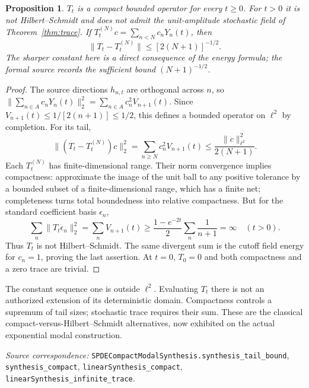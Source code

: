 \documentclass[11pt]{article}
\newtheorem{proposition}[theorem]{Proposition}
\newcommand{\code}[1]{{\small\nolinkurl{#1}}}
\begin{document}
\begin{proposition}\label{prop:compact}
$T_t$ is a compact bounded operator for every $t\geq0$. For $t>0$ it
is not Hilbert--Schmidt and does not admit the unit-amplitude stochastic
field of Theorem~\ref{thm:trace}. If
$T_t^{(N)}c=\sum_{n<N}c_nY_n(t)$, then
\[
 \|T_t-T_t^{(N)}\|\leq[2(N+1)]^{-1/2}.
\]
The sharper constant here is a direct consequence of the energy formula;
the formal source records the sufficient bound $(N+1)^{-1/2}$.
\end{proposition}
\begin{proof}
The source directions $h_{n,t}$ are orthogonal across $n$, so
$\|\sum_{n\in A}c_nY_n(t)\|_2^2=\sum_{n\in A}c_n^2V_{n+1}(t)$.
Since $V_{n+1}(t)\leq1/[2(n+1)]\leq1/2$, this defines a bounded
operator on $\ell^2$ by completion. For its tail,
\[
 \|(T_t-T_t^{(N)})c\|_2^2
  =\sum_{n\geq N}c_n^2V_{n+1}(t)
  \leq\frac{\|c\|_{\ell^2}^2}{2(N+1)}.
\]
Each $T_t^{(N)}$ has finite-dimensional range. Their norm convergence
implies compactness: approximate the image of the unit ball to any
positive tolerance by a bounded subset of a finite-dimensional range,
which has a finite net; completeness turns total boundedness into
relative compactness. But for the standard coefficient basis $\epsilon_n$,
\[
 \sum_n\|T_t\epsilon_n\|_2^2
   =\sum_nV_{n+1}(t)
   \geq\frac{1-e^{-2t}}2\sum_n\frac1{n+1}=\infty
 \quad(t>0).
\]
Thus $T_t$ is not Hilbert--Schmidt. The same divergent sum is the
cutoff field energy for $c_n=1$, proving the last assertion.
At $t=0$, $T_0=0$ and both compactness and a zero trace are trivial.
\end{proof}
The constant sequence one is outside $\ell^2$. Evaluating $T_t$ there
is not an authorized extension of its deterministic domain. Compactness
controls a supremum of tail sizes; stochastic trace requires their sum.
These are the classical compact-versus-Hilbert--Schmidt alternatives,
now exhibited on the actual exponential modal construction.
\par\smallskip\begingroup\small\raggedright
\noindent\textit{Source correspondence:}
\code{SPDECompactModalSynthesis.synthesis_tail_bound},
\code{synthesis_compact}, \code{linearSynthesis_compact},
\code{linearSynthesis_infinite_trace}.\par\endgroup
\end{document}
